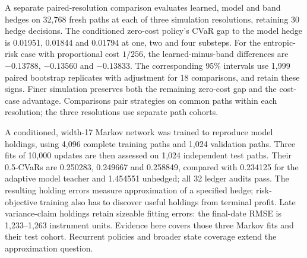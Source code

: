 \documentclass[8pt]{strategynet-journal}
\begin{document}
\begin{SNcolumns}
A separate paired-resolution comparison evaluates learned, model and band
hedges on 32,768 fresh paths at each of three simulation resolutions, retaining
30 hedge decisions. The conditioned zero-cost policy's CVaR gap to the model
hedge is 0.01951, 0.01844 and 0.01794 at one, two and four substeps. For the
entropic-risk case with proportional cost $1/256$, the learned-minus-band
differences are $-0.13788$, $-0.13560$ and $-0.13833$. The corresponding 95\% intervals use 1,999 paired bootstrap replicates with
adjustment for 18 comparisons, and retain these signs. Finer simulation preserves both
the remaining zero-cost gap and the cost-case advantage. Comparisons pair
strategies on common paths within each resolution; the three resolutions use
separate path cohorts.

A conditioned, width-17 Markov network was trained to reproduce model holdings,
using 4,096 complete training paths and 1,024 validation paths. Three fits of
10,000 updates are then assessed on 1,024 independent test paths. Their
0.5-CVaRs are 0.250283, 0.249667 and 0.258849, compared with 0.234125 for the
adaptive model teacher and 1.454551 unhedged; all 32 ledger audits pass.
The resulting holding errors measure approximation of a specified hedge;
risk-objective training also has to discover useful holdings from terminal profit. Late variance-claim
holdings retain sizeable fitting errors: the final-date RMSE is
1,233--1,263 instrument units. Evidence here covers those three Markov fits
and their test cohort. Recurrent policies and broader state coverage extend
the approximation question.


\end{SNcolumns}
\end{document}

